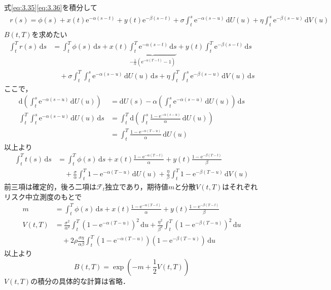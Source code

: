 \documentclass[a4paper, lualatex, ja=standard]{bxjsarticle}
\theoremstyle{theorem}
\theoremstyle{definition}
\theoremstyle{definition}
\newcommand{\F}{\mathcal{F}}
\newcommand{\diff}{\mathrm{d}}
\begin{document}
式\eqref{eq:3.35}\eqref{eq:3.36}を積分して
\begin{align}
  \begin{aligned}
  r(s)= \phi(s)+x(t) \mathrm{e}^{-\alpha(s-t)}+y(t) \mathrm{e}^{-\beta(s-t)}  +\sigma \int_t^s \mathrm{e}^{-\alpha(s-u)} \,\diff U(u)+\eta \int_t^s \mathrm{e}^{-\beta(s-u)} \,\diff V(u)
  \end{aligned}
\end{align}
$B(t,T)$を求めたい
\begin{align*}
  \int_t^T r(s)\,\diff s &= \int_t^T\phi(s)\,\diff s + x(t)\underbrace{\int_t^T\mathrm{e}^{-\alpha(s-t)}\,\diff s}_{-\frac{1}{\alpha}(\mathrm{e}^{-\alpha(T-t)}-1)} + y(t)\int_t^T\mathrm{e}^{-\beta(s-t)}\,\diff s \\
  &\quad +\sigma\int_t^T\int_t^s\mathrm{e}^{-\alpha(s-u)}\,\diff U(u)\,\diff s + \eta\int_t^T\int_t^s\mathrm{e}^{-\beta(s-u)}\,\diff V(u)\,\diff s
\end{align*}
ここで，
\begin{align*}
  \diff\left(\int_t^s \mathrm{e}^{-\alpha(s-u)}\,\diff U(u)\right) &= \diff U(s) - \alpha\left(\int_t^s \mathrm{e}^{-\alpha(s-u)}\,\diff U(u)\right)\,\diff s \\
  \int_t^T\int_t^s\mathrm{e}^{-\alpha(s-u)}\,\diff U(u)\,\diff s &= \int_t^T\diff \left(\int_t^s\frac{1-\mathrm{e}^{-\alpha(s-u)}}{\alpha}\,\diff U(u)\right) \\
  &= \int_t^T \frac{1-\mathrm{e}^{-\alpha(T-u)}}{\alpha}\,\diff U(u)
\end{align*}
以上より
\begin{align*}
  \int_t^T t(s)\,\diff s &= \int_t^T\phi(s)\,\diff s + x(t)\frac{1-\mathrm{e}^{-\alpha(T-t)}}{\alpha} + y(t)\frac{1-\mathrm{e}^{-\beta(T-t)}}{\beta} \\
  & \quad + \frac{\sigma}{\alpha} \int_t^T 1-\mathrm{e}^{-\alpha(T-u)}\,\diff U(u) + \frac{\eta}{\beta} \int_t^T 1-\mathrm{e}^{-\beta(T-u)}\,\diff V(u)
\end{align*}
前三項は確定的，後ろ二項は$\F_t$独立であり，期待値$m$と分散$V(t,T)$はそれぞれリスク中立測度のもとで
\begin{align*}
  m &= \int_t^T\phi(s)\,\diff s + x(t)\frac{1-\mathrm{e}^{-\alpha(T-t)}}{\alpha} + y(t)\frac{1-\mathrm{e}^{-\beta(T-t)}}{\beta} \\
  V(t,T) &= \frac{\sigma^2}{\alpha^2} \int_t^T \left(1-\mathrm{e}^{-\alpha(T-u)}\right)^2\,\diff u + \frac{\eta^2}{\beta^2} \int_t^T \left(1-\mathrm{e}^{-\beta(T-u)}\right)^2\,\diff u \\
  & \quad + 2\rho\frac{\sigma\eta}{\alpha\beta}\int_t^T\left(1-\mathrm{e}^{-\alpha(T-u)}\right)\left(1-\mathrm{e}^{-\beta(T-u)}\right)\,\diff u \tag{3.40}
\end{align*}
以上より
\begin{equation}
  B(t,T) = \exp\left(-m + \frac{1}{2}V(t,T)\right)
\end{equation}
$V(t,T)$の積分の具体的な計算は省略．
\end{document}

